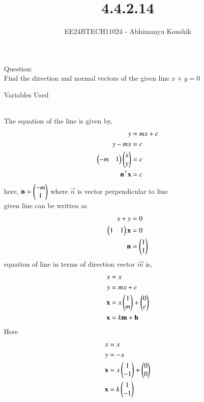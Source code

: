 \documentclass[journal]{IEEEtran}
\begin{document}

\vspace{3cm}

\title{4.4.2.14}
\author{EE24BTECH11024 - Abhimanyu Koushik}
{\let\newpage\relax\maketitle}
Question:\\
Find the direction and normal vectors of the given line $x+y=0$
\begin{table}[h!]    
  \centering
  
  \caption{Variables Used}
  \label{tab1-1.9-6}
\end{table}\\
\solution
The equation of the line is given by,
\begin{align}
	y&=mx+c\\
	y-mx&=c\\
	\begin{pmatrix}-m & 1\end{pmatrix}\begin{pmatrix}x\\y\end{pmatrix}&=c\\
	\mathbf{n}^\top\mathbf{x}&=c
\end{align}
here, $\mathbf{n}=\begin{pmatrix}-m\\1\end{pmatrix}$ where $\vec{n}$ is vector perpendicular to line\\
given line can be written as
\begin{align}
x+y&=0\\
\begin{pmatrix}1&1\end{pmatrix}\mathbf{x}&=0\\
\mathbf{n}&=\begin{pmatrix}1\\1\end{pmatrix}
\end{align}
equation of line in terms of direction vector $\vec{m}$ is,
\begin{align}
x&=x\\
y&=mx+c\\
\mathbf{x}&=x\begin{pmatrix}1\\m\end{pmatrix}+\begin{pmatrix}0\\c\end{pmatrix}\\
\mathbf{x}&=k\mathbf{m}+\mathbf{h}
\end{align}
Here
\begin{align}
x&=x\\
y&=-x\\
\mathbf{x}&=x\begin{pmatrix}1\\-1\end{pmatrix}+\begin{pmatrix}0\\0\end{pmatrix}\\
\mathbf{x}&=k\begin{pmatrix}1\\-1\end{pmatrix}
\end{align}
\end{document}
